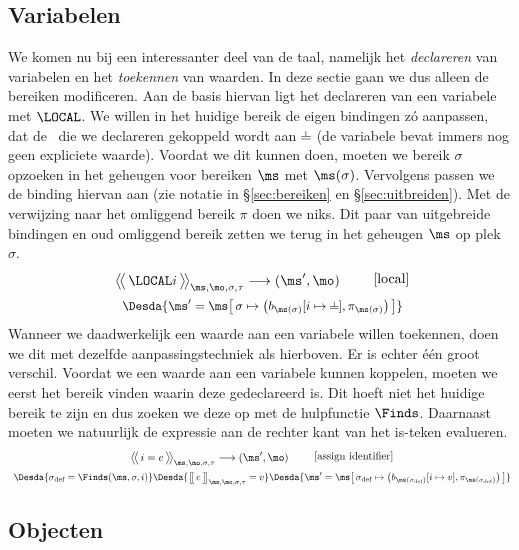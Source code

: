\subsection{Variabelen}

We komen nu bij een interessanter deel van de taal, namelijk het \emph{declareren} van variabelen en het \emph{toekennen} van waarden. In deze sectie gaan we dus alleen de bereiken modificeren. Aan de basis hiervan ligt het declareren van een variabele met $\LOCAL$. We willen in het huidige bereik de eigen bindingen zó aanpassen, dat de \Id\ die we declareren gekoppeld wordt aan $\nil$ (de variabele bevat immers nog geen expliciete waarde). Voordat we dit kunnen doen, moeten we bereik $\sigma$ opzoeken in het geheugen voor bereiken $\ms$ met $\ms(\sigma)$. Vervolgens passen we de binding hiervan aan (zie notatie in §\ref{sec:bereiken} en §\ref{sec:uitbreiden}). Met de verwijzing naar het omliggend bereik $\pi$ doen we niks. Dit paar van uitgebreide bindingen en oud omliggend bereik zetten we terug in het geheugen $\ms$ op plek $\sigma$.
%
\begin{gather*}
  \AxiomC{$
    \Config{\LOCAL i}{\ms, \mo, \sigma, \tau}
    \longrightarrow
    (\ms', \mo)
  $}
  {\DisplayProof}
  \tag*{[local]} \\
  \Desdas{
    \Desda{\ms' = \ms \surr{ \sigma \mapsto \big(b_{\ms(\sigma)}[i \mapsto \BOT], \pi_{\ms(\sigma)}\big) }}
  }
\end{gather*}
%
Wanneer we daadwerkelijk een waarde aan een variabele willen toekennen, doen we dit met dezelfde aanpassingstechniek als hierboven. Er is echter één groot verschil. Voordat we een waarde aan een variabele kunnen koppelen, moeten we eerst het bereik vinden waarin deze gedeclareerd is. Dit hoeft niet het huidige bereik te zijn en dus zoeken we deze op met de hulpfunctie $\Finds$. Daarnaast moeten we natuurlijk de expressie aan de rechter kant van het is-teken evalueren.
%
\begin{gather*}
  \AxiomC{$
    \Config{i = e}{\ms, \mo, \sigma, \tau}
    \longrightarrow
    (\ms', \mo)
  $}
  {\DisplayProof}
  \tag*{[assign identifier]} \\
  \Desdas{
    \Desda{\sigma_\text{def} = \Finds(\ms, \sigma, i)}
    \Desda{\Surr{e}_{\ms, \mo, \sigma, \tau} = v}
    \Desda{\ms'= \ms \surr{ \sigma_\text{def} \mapsto \big(b_{\ms(\sigma_\text{def})}[ i \mapsto v ], \pi_{\ms(\sigma_\text{def})}\big) }}
  }
\end{gather*}

\subsection{Objecten}

